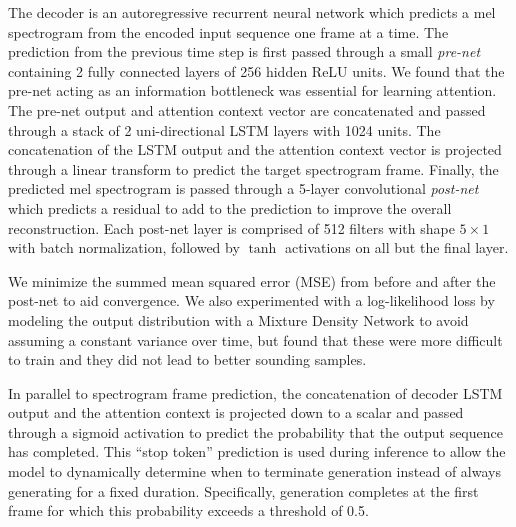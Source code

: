 The decoder is an autoregressive recurrent neural network which
predicts a mel spectrogram from the encoded input sequence one
frame at a time.
%
The prediction from the previous time step is first passed through a
small \emph{pre-net} containing 2 fully connected layers of 256 hidden ReLU units.
We found that the pre-net acting as an information bottleneck was essential for
learning attention.
%
The pre-net output and attention context vector are concatenated and
passed through a stack of 2 uni-directional LSTM layers with 1024 units.
%
The concatenation of the LSTM output and the attention context vector is
projected through a linear transform to predict the target
spectrogram frame.
Finally, the predicted mel spectrogram is passed through a 5-layer convolutional
\emph{post-net} which predicts a residual to add to the prediction to improve the
overall reconstruction.
%
Each post-net layer is comprised of 512 filters with shape $5\times1$ with
batch normalization, followed by $\tanh$ activations on all but the final layer.

We minimize the summed mean squared error (MSE) from before and after the
post-net to aid convergence.  We also experimented with a log-likelihood loss by
modeling the output distribution with a Mixture Density Network
\cite{Bishop94mixturedensity,Schuster99onsupervised} to avoid assuming
a constant variance over time, but found that these were more difficult to
train and they did not lead to better sounding samples.

In parallel to spectrogram frame prediction, the concatenation of
decoder LSTM output and the attention context
is projected down to a scalar and passed through a sigmoid activation
to predict the probability that the output sequence has completed.
This ``stop token'' prediction is used during inference to allow the model to
dynamically determine when to terminate generation instead of always generating
for a fixed duration.
Specifically, generation completes at the first frame for which this probability
exceeds a threshold of 0.5.

